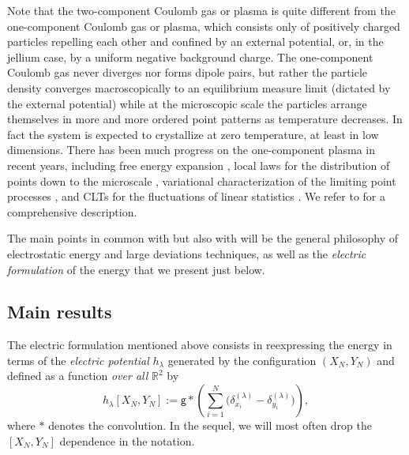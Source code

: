 \documentclass[a4paper,10pt,leqno]{amsart}
\numberwithin{equation}{section}
\newcommand{\R}{\mathbb{R}}
\def\g{\mathsf{g}}
\begin{document}
Note that the two-component Coulomb gas or plasma is quite different from the one-component Coulomb gas or plasma, which consists only of positively charged particles repelling each other and confined by an external potential, or, in the jellium case, by a uniform negative background charge. The one-component Coulomb gas never diverges nor forms dipole pairs, but rather the particle density converges macroscopically to an equilibrium measure limit (dictated by the external potential) while at the microscopic scale the particles arrange themselves in more and more ordered point patterns as temperature decreases. In fact the system is expected to crystallize at zero temperature, at least in low dimensions. There has been much progress on the one-component plasma in recent years, including free energy expansion \cite{Lieb1997,LS1,Armstrong2019LocalLA,serfaty2020gaussian}, local laws for the distribution of points down to the microscale \cite{leble2017local,Armstrong2019LocalLA}, variational characterization of the limiting point processes \cite{LS1}, and CLTs for the fluctuations of linear statistics \cite{ameur2011fluctuations,rider2007noise,bauerschmidt2016two,LS2,serfaty2020gaussian}. We refer to \cite{serfaty2024lectures} for a comprehensive description.

The main points in common with \cite{SS2d,LS1,leble2017local,LS2,Armstrong2019LocalLA,serfaty2020gaussian} but also with \cite{LSZ} will be the general philosophy of electrostatic energy and large deviations techniques, as well as the \emph{electric formulation} of the energy that we present just below.

\subsection{Main results}

The electric formulation mentioned above consists in reexpressing the energy in terms of the \emph{electric potential} $h_\lambda$ generated by the configuration $(X_N, Y_N)$ and defined as a function \emph{over all} $\R^2$ by
\begin{equation}\label{eq:heta}h_\lambda[X_N, Y_N]:= \g* \left( \sum_{i=1}^N \bigl(\delta_{x_i}^{(\lambda)}-\delta_{y_i}^{(\lambda)}\bigr)\right),\end{equation} where $*$ denotes the convolution.
In the sequel, we will most often drop the $[X_N, Y_N]$ dependence in the notation.
\end{document}

